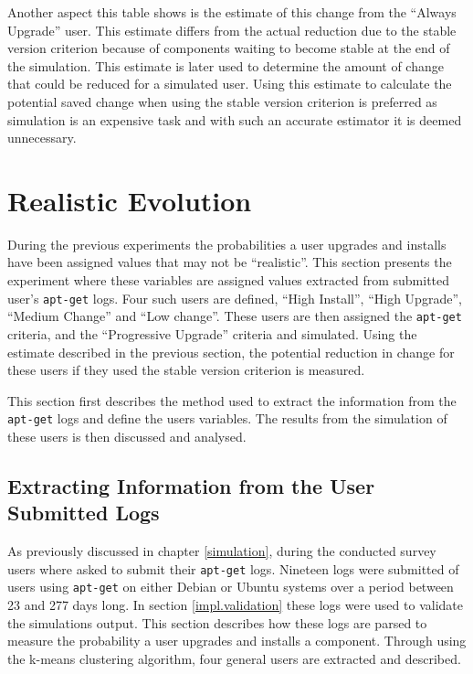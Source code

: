 Another aspect this table shows is the estimate of this change from the ``Always Upgrade'' user.
This estimate differs from the actual reduction due to the stable version criterion because of components waiting to become stable at the end of the simulation.
This estimate is later used to determine the amount of change that could be reduced for a simulated user.
Using this estimate to calculate the potential saved change when using the stable version criterion is preferred 
as simulation is an expensive task and with such an accurate estimator it is deemed unnecessary. 

\section{Realistic Evolution}
\label{exp.realuserssim}
During the previous experiments the probabilities a user upgrades and installs have been assigned values that may not be ``realistic''.
This section presents the experiment where these variables are assigned values extracted from submitted user's \texttt{apt-get} logs.
Four such users are defined, ``High Install'', ``High Upgrade'', ``Medium Change'' and ``Low change''.
These users are then assigned the \texttt{apt-get} criteria, and the ``Progressive Upgrade'' criteria and simulated.
Using the estimate described in the previous section, the potential reduction in change for these users if they used the stable version criterion is measured.

This section first describes the method used to extract the information from the \texttt{apt-get} logs and define the users variables.
The results from the simulation of these users is then discussed and analysed.

\subsection{Extracting Information from the User Submitted Logs}
As previously discussed in chapter \ref{simulation}, during the conducted survey users where asked to submit their \texttt{apt-get} logs.
Nineteen logs were submitted of users using \texttt{apt-get} on either Debian or Ubuntu systems over a period between 23 and 277 days long. 
In section \ref{impl.validation} these logs were used to validate the simulations output.
This section describes how these logs are parsed to measure the probability a user upgrades and installs a component.
Through using the k-means clustering algorithm, four general users are extracted and described.

